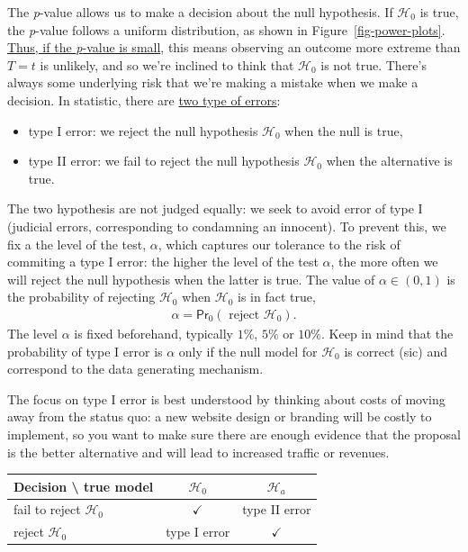 \documentclass[
  11pt,
  letterpaper,
]{scrbook}
\providecommand{\tightlist}{%
  \setlength{\itemsep}{0pt}\setlength{\parskip}{0pt}}\usepackage{longtable,booktabs,array}
\theoremstyle{definition}
\theoremstyle{definition}
\theoremstyle{remark}
\begin{document}
The \emph{p}-value allows us to make a decision about the null
hypothesis. If \(\mathscr{H}_0\) is true, the \emph{p}-value follows a
uniform distribution, as shown in Figure~\ref{fig-power-plots}.
\href{https://xkcd.com/1478/}{Thus, if the \emph{p}-value is small},
this means observing an outcome more extreme than \(T=t\) is unlikely,
and so we're inclined to think that \(\mathscr{H}_0\) is not true.
There's always some underlying risk that we're making a mistake when we
make a decision. In statistic, there are
\href{https://xkcd.com/2303/}{two type of errors}:

\begin{itemize}
\tightlist
\item
  type I error: we reject the null hypothesis \(\mathscr{H}_0\) when the
  null is true,
\item
  type II error: we fail to reject the null hypothesis \(\mathscr{H}_0\)
  when the alternative is true.
\end{itemize}

The two hypothesis are not judged equally: we seek to avoid error of
type I (judicial errors, corresponding to condamning an innocent). To
prevent this, we fix a the level of the test, \(\alpha\), which captures
our tolerance to the risk of commiting a type I error: the higher the
level of the test \(\alpha\), the more often we will reject the null
hypothesis when the latter is true. The value of \(\alpha \in (0, 1)\)
is the probability of rejecting \(\mathscr{H}_0\) when \(\mathscr{H}_0\)
is in fact true, \begin{align*}
\alpha = \mathsf{Pr}_0\left(\text{ reject } \mathscr{H}_0\right).
\end{align*} The level \(\alpha\) is fixed beforehand, typically
\(1\)\%, \(5\)\% or \(10\)\%. Keep in mind that the probability of type
I error is \(\alpha\) only if the null model for \(\mathscr{H}_0\) is
correct (sic) and correspond to the data generating mechanism.

The focus on type I error is best understood by thinking about costs of
moving away from the status quo: a new website design or branding will
be costly to implement, so you want to make sure there are enough
evidence that the proposal is the better alternative and will lead to
increased traffic or revenues.

\begin{longtable}[]{@{}lcc@{}}
\toprule\noalign{}
\textbf{Decision} \textbackslash{} \textbf{true model} &
\(\mathscr{H}_0\) & \(\mathscr{H}_a\) \\
\midrule\noalign{}
\endhead
\bottomrule\noalign{}
\endlastfoot
fail to reject \(\mathscr{H}_0\) & \(\checkmark\) & type II error \\
reject \(\mathscr{H}_0\) & type I error & \(\checkmark\) \\
\end{longtable}
\end{document}
